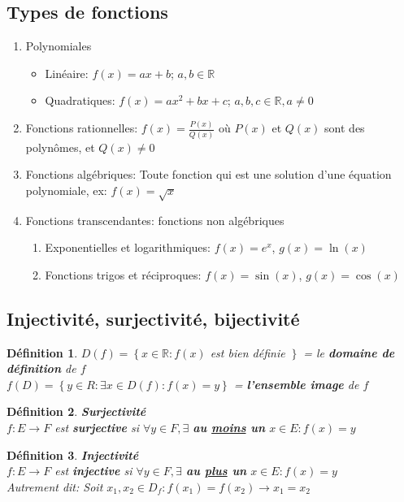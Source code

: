 \documentclass[10pt,a4paper]{book}
\newcommand{\R}{\mathbb{R}}
\newtheorem{definition}{Définition}[section]
\begin{document}
\subsection{Types de fonctions}
\begin{enumerate}
\item Polynomiales
\begin{itemize}
\item Linéaire: $f(x) = ax + b$; $a,b \in \R$
\item Quadratiques: $f(x) = ax^2 + bx + c$; $a,b,c \in \R, a \neq 0$
\end{itemize}
\item Fonctions rationnelles: $f(x) = \frac{P(x)}{Q(x)}$ où $P(x)$ et $Q(x)$ sont des polynômes, et $Q(x) \neq 0$
\item Fonctions algébriques: Toute fonction qui est une solution d'une équation polynomiale, ex: $f(x) = \sqrt{x}$
\item Fonctions transcendantes: fonctions non algébriques
\begin{enumerate}
\item Exponentielles et logarithmiques: $f(x) = e^x$, $g(x) = \ln(x)$
\item Fonctions trigos et réciproques: $f(x) = \sin(x)$, $g(x) = \cos(x)$ 
\end{enumerate}
\end{enumerate}

\subsection{Injectivité, surjectivité, bijectivité}

\begin{definition}
$D(f) = \left\lbrace x \in \R: f(x) \right.$ est bien définie $\left. \right\rbrace$ = le \textbf{domaine de définition} de $f$ \\
$f(D) = \left\lbrace y \in R: \exists x \in D(f): f(x) = y \right\rbrace$ = \textbf{l'ensemble image} de $f$
\end{definition}

\begin{definition} \textbf{Surjectivité}\\
$f: E \rightarrow F$ est \textbf{surjective} si $\forall y \in F, \exists$ \textbf{au \underline{moins} un} $x\in E: f(x) = y$
\end{definition}

\begin{definition} \textbf{Injectivité}\\
$f: E \rightarrow F$ est \textbf{injective} si $\forall y \in F, \exists$ \textbf{au \underline{plus} un} $x\in E: f(x) = y$ \\
Autrement dit: Soit $x_1, x_2 \in D_f: f(x_1) = f(x_2) \rightarrow x_1 = x_2$
\end{definition}
\end{document}
